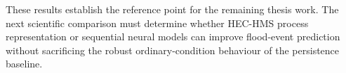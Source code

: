 \documentclass[twocolumn,twoside,a4paper,10pt]{IEEEtran}
\begin{document}
These results establish the reference point for the remaining thesis work.
The next scientific comparison must determine whether HEC-HMS process
representation or sequential neural models can improve flood-event
prediction without sacrificing the robust ordinary-condition behaviour of
the persistence baseline.



\end{document}

